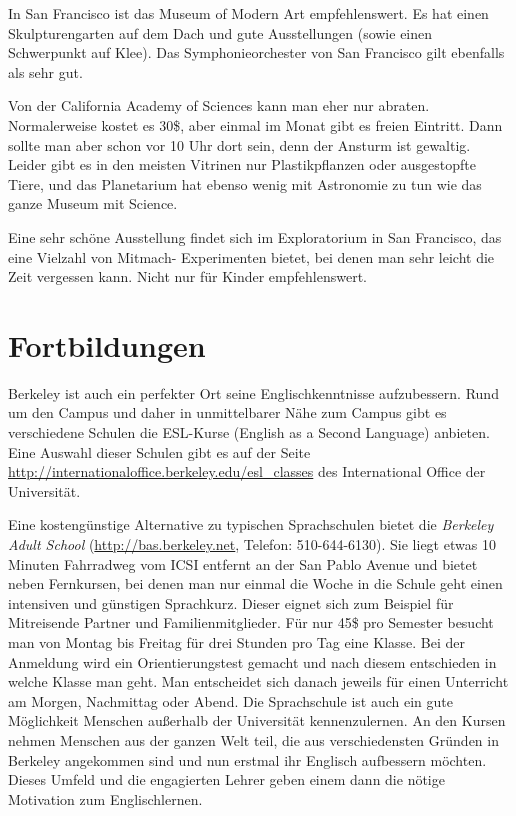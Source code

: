 \documentclass[a4paper]{scrreprt}
\begin{document}
In San Francisco ist das Museum of Modern Art empfehlenswert. Es hat einen Skulpturengarten auf dem Dach und gute Ausstellungen (sowie einen Schwerpunkt auf Klee). Das Symphonieorchester von San Francisco gilt ebenfalls als sehr gut.

Von der California Academy of Sciences kann man eher nur abraten. Normalerweise kostet es 30\$, aber einmal im Monat gibt es freien Eintritt. Dann sollte man aber schon vor 10 Uhr dort sein, denn der Ansturm ist gewaltig. Leider gibt es in den meisten Vitrinen nur Plastikpflanzen oder ausgestopfte Tiere, und das Planetarium hat ebenso wenig mit Astronomie zu tun wie das ganze Museum mit Science.

Eine sehr schöne Ausstellung findet sich im Exploratorium in San Francisco, das eine Vielzahl von Mitmach- Experimenten bietet, bei denen man sehr leicht die Zeit vergessen kann. Nicht nur für Kinder empfehlenswert.
 
\section{Fortbildungen}

Berkeley ist auch ein perfekter Ort seine Englischkenntnisse
aufzubessern. Rund um den Campus und daher in unmittelbarer Nähe zum
Campus gibt es verschiedene Schulen die ESL-Kurse (English as a Second
Language) anbieten. Eine Auswahl dieser Schulen gibt es auf der Seite
\url{http://internationaloffice.berkeley.edu/esl_classes} des International
Office der Universität.  

Eine kostengünstige Alternative zu typischen Sprachschulen bietet die
\emph{Berkeley Adult School} (\url{http://bas.berkeley.net}, Telefon:
510-644-6130). Sie liegt etwas 10 Minuten Fahrradweg vom ICSI entfernt
an der San Pablo Avenue und bietet neben Fernkursen, bei denen man nur
einmal die Woche in die Schule geht einen intensiven und günstigen
Sprachkurz. Dieser eignet sich zum Beispiel für Mitreisende Partner
und Familienmitglieder. Für nur 45\$ pro Semester besucht man von
Montag bis Freitag für drei Stunden pro Tag eine Klasse. Bei der
Anmeldung wird ein Orientierungstest gemacht und nach diesem
entschieden in welche Klasse man geht. Man entscheidet sich danach
jeweils für einen Unterricht am Morgen, Nachmittag oder Abend. Die
Sprachschule ist auch ein gute Möglichkeit Menschen außerhalb der
Universität kennenzulernen. An den Kursen nehmen Menschen aus der
ganzen Welt teil, die aus verschiedensten Gründen in Berkeley
angekommen sind und nun erstmal ihr Englisch aufbessern
möchten. Dieses Umfeld und die engagierten Lehrer geben einem dann die
nötige Motivation zum Englischlernen. 
\end{document}
